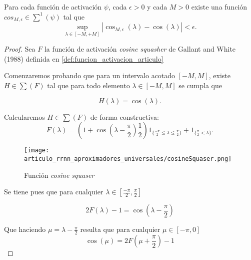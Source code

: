 \begin{lema}\label{lema:A_3_función_activación_continua_con_arbitaria}
    Para cada función de activación $\psi$, cada $\epsilon >0$
    y cada $M>0$ existe una función 
    $cos_{M,\epsilon} \in \sum^1(\psi)$ tal que 
    \begin{equation}
        \sup_{ \lambda \in [-M, +M]}
        |\cos_{M,\epsilon}(\lambda) - \cos(\lambda)|
        < 
        \epsilon. 
    \end{equation}
\end{lema}
\begin{proof}
    Sea $F$ la función de activación \textit{cosine squasher} de Gallant and White (1988) definida 
    en \ref{def:funcion_activacion_articulo}

    Comenzaremos probando que para un intervalo acotado $[-M, M]$, existe $H \in \sum(F)$ 
    tal que para todo elemento $\lambda \in [-M, M]$ se cumpla que 

    \begin{equation}
        H(\lambda) = \cos(\lambda).
    \end{equation}

    Calcularemos $H \in \sum(F)$  de forma constructiva: 
    \begin{equation}
        F(\lambda )= \left(1 + \cos\left(\lambda -\frac{\pi}{2} \right) \frac{1}{2}\right) 
         1_{\{\frac{-\pi}{2} \leq \lambda \leq  \frac{\pi}{2}\}}
         +
         1_{\{ \frac{\pi}{2} < \lambda \}}.
    \end{equation}
    
    \begin{figure}[h]
        \centering
        \texttt{[image: articulo\_rrnn\_aproximadores\_universales/cosineSquaser.png]}
        \caption{Función \textit{cosine squaser}}
        \label{fig:cosine_squaser}
    \end{figure}

    Se tiene pues que para cualquier $\lambda \in \left[ \frac{-\pi}{2}, \frac{\pi}{2}\right]$

    \begin{equation}
        2 F(\lambda)-1 = \cos \left( \lambda - \frac{\pi}{2}\right)
    \end{equation}

    Que haciendo $\mu = \lambda - \frac{\pi}{2}$ resulta que para cualquier
    $\mu \in [-\pi, 0]$
    \begin{equation}
        \cos(\mu) = 2 F \left(\mu + \frac{\pi}{2} \right)  -1 
    \end{equation}


\end{proof}
